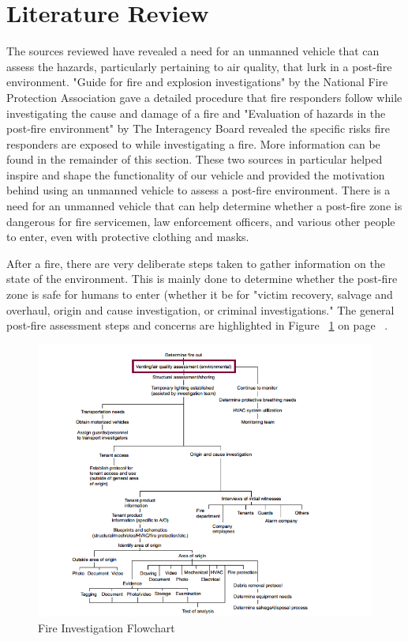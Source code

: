 \section{Literature Review}
The sources reviewed have revealed a need for an unmanned vehicle that can assess the hazards, particularly pertaining to air quality, that lurk in a post-fire environment. "Guide for fire and explosion investigations" by the National Fire Protection Association gave a detailed procedure that fire responders follow while investigating the cause and damage of a fire\cite{nfpa} and "Evaluation of hazards in the post-fire environment" by The Interagency Board revealed the specific risks fire responders are exposed to while investigating a fire\cite{evaluationofhazards}. More information can be found in the remainder of this section. These two sources in particular helped inspire and shape the functionality of our vehicle and provided the motivation behind using an unmanned vehicle to assess a post-fire environment. There is a need for an unmanned vehicle that can help determine whether a post-fire zone is dangerous for fire servicemen, law enforcement officers, and various other people to enter, even with protective clothing and masks.\cite{evaluationofhazards} 

After a fire, there are very deliberate steps taken to gather information on the state of the environment. This is mainly done to determine whether the post-fire zone is safe for humans to enter (whether it be for "victim recovery, salvage and overhaul, origin and cause investigation, or criminal investigations." \cite{evaluationofhazards} The general post-fire assessment steps and concerns are highlighted in Figure ~\ref{fig:FireInvesFlowChart} on page ~\pageref{fig:FireInvesFlowChart}.



\begin{figure}[H]
\centering
\includegraphics[scale=0.75]{flowchart.png}
\caption{Fire Investigation Flowchart  \cite{nfpa}}
\label{fig:FireInvesFlowChart}
\end{figure}

